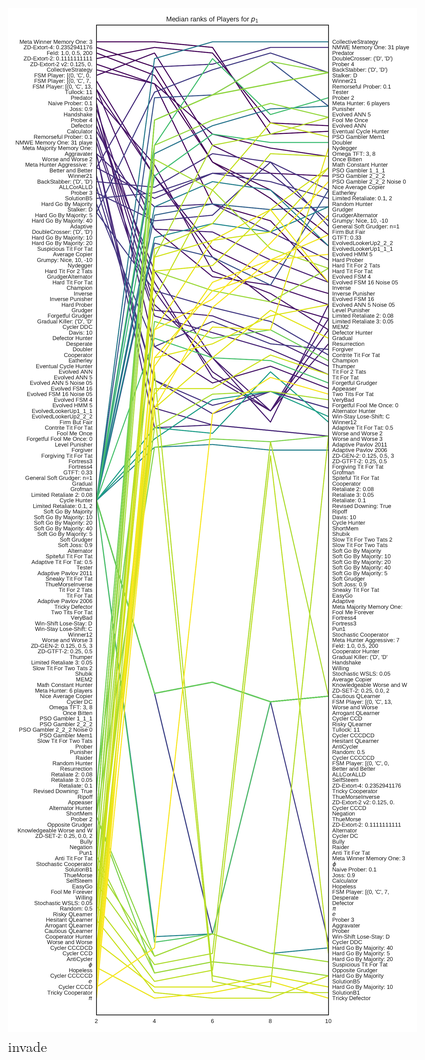 \documentclass{article}
\begin{document}
\begin{figure}[!hbtp]
    \centering
    \includegraphics[height=.9\textheight]{../img/median_rank_vs_population_size_invade.pdf}
    \caption{invade}
    \label{fig:ranks_v_size_invade}
\end{figure}
\end{document}
